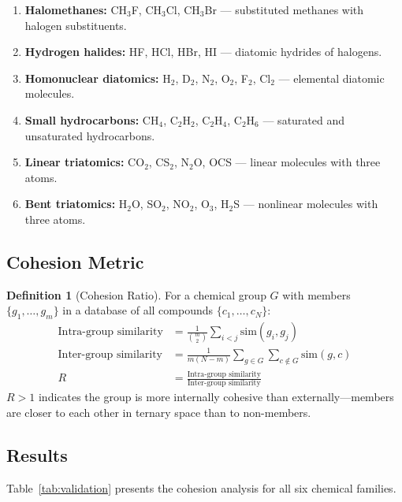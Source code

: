 \documentclass[11pt,twocolumn,a4paper]{article}
\theoremstyle{definition}
\newtheorem{definition}[theorem]{Definition}
\theoremstyle{remark}
\begin{document}
\begin{enumerate}[nosep]
\item \textbf{Halomethanes:} CH$_3$F, CH$_3$Cl, CH$_3$Br --- substituted methanes with halogen substituents.
\item \textbf{Hydrogen halides:} HF, HCl, HBr, HI --- diatomic hydrides of halogens.
\item \textbf{Homonuclear diatomics:} H$_2$, D$_2$, N$_2$, O$_2$, F$_2$, Cl$_2$ --- elemental diatomic molecules.
\item \textbf{Small hydrocarbons:} CH$_4$, C$_2$H$_2$, C$_2$H$_4$, C$_2$H$_6$ --- saturated and unsaturated hydrocarbons.
\item \textbf{Linear triatomics:} CO$_2$, CS$_2$, N$_2$O, OCS --- linear molecules with three atoms.
\item \textbf{Bent triatomics:} H$_2$O, SO$_2$, NO$_2$, O$_3$, H$_2$S --- nonlinear molecules with three atoms.
\end{enumerate}

\subsection{Cohesion Metric}

\begin{definition}[Cohesion Ratio]
\label{def:cohesion}
For a chemical group $G$ with members $\{g_1, \ldots, g_m\}$ in a database of all compounds $\{c_1, \ldots, c_N\}$:
\begin{align}
\text{Intra-group similarity} &= \frac{1}{\binom{m}{2}} \sum_{i < j} \mathrm{sim}(g_i, g_j) \label{eq:intra} \\
\text{Inter-group similarity} &= \frac{1}{m(N-m)} \sum_{g \in G} \sum_{c \notin G} \mathrm{sim}(g, c) \label{eq:inter} \\
R &= \frac{\text{Intra-group similarity}}{\text{Inter-group similarity}} \label{eq:cohesion_ratio}
\end{align}
$R > 1$ indicates the group is more internally cohesive than externally---members are closer to each other in ternary space than to non-members.
\end{definition}

\subsection{Results}

Table~\ref{tab:validation} presents the cohesion analysis for all six chemical families.
\end{document}
